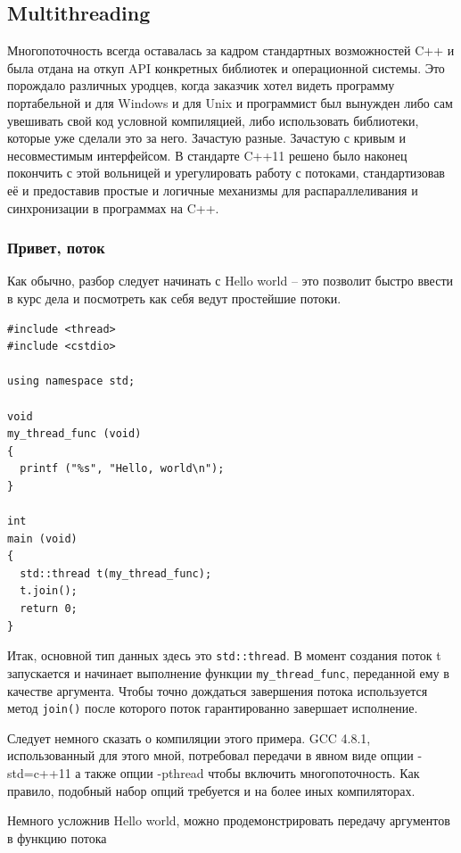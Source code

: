 \documentclass[a4paper,12pt,oneside]{article}
\begin{document}
\subsection{Multithreading}

Многопоточность всегда оставалась за кадром стандартных возможностей C++ и была отдана на откуп API конкретных библиотек и операционной системы. Это порождало различных уродцев, когда заказчик хотел видеть программу портабельной и для Windows и для Unix и программист был вынужден либо сам увешивать свой код условной компиляцией, либо использовать библиотеки, которые уже сделали это за него. Зачастую разные. Зачастую с кривым и несовместимым интерфейсом. В стандарте C++11 решено было наконец покончить с этой вольницей и урегулировать работу с потоками, стандартизовав её и предоставив простые и логичные механизмы для распараллеливания и синхронизации в программах на C++.

\subsubsection{Привет, поток}

Как обычно, разбор следует начинать с Hello world -- это позволит быстро ввести в курс дела и посмотреть как себя ведут простейшие потоки.

\begin{lstlisting}
#include <thread>
#include <cstdio>

using namespace std;

void 
my_thread_func (void)
{
  printf ("%s", "Hello, world\n");
}

int 
main (void)
{
  std::thread t(my_thread_func);
  t.join();
  return 0;
}
\end{lstlisting}

Итак, основной тип данных здесь это \lstinline!std::thread!. В момент создания поток t запускается и начинает выполнение функции \lstinline!my_thread_func!, переданной ему в качестве аргумента. Чтобы точно дождаться завершения потока используется метод \lstinline!join()! после которого поток гарантированно завершает исполнение.

Следует немного сказать о компиляции этого примера. GCC 4.8.1, использованный для этого мной, потребовал передачи в явном виде опции -std=c++11 а также опции -pthread чтобы включить многопоточность. Как правило, подобный набор опций требуется и на более иных компиляторах.

Немного усложнив Hello world, можно продемонстрировать передачу аргументов в функцию потока
\end{document}
